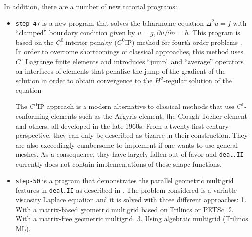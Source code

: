 \documentclass{ansarticle-preprint}
\newcommand{\specialword}[1]{\texttt{#1}}
\newcommand{\dealii}{{\specialword{deal.II}}\xspace}
\begin{document}
In addition, there are a number of new tutorial programs:
\begin{itemize}
  \item \texttt{step-47} is a new program that solves the biharmonic
        equation $\Delta^2 u = f$ with
        ``clamped'' boundary condition given by $u=g, \partial u/\partial
          n=h$. This program is based on the $C^0$ interior
        penalty ($C^0$IP) method for fourth order problems
        \cite{Brenner2005}. In order to overcome
        shortcomings of classical approaches, this method uses $C^0$ Lagrange finite
        elements and introduces ``jump'' and ``average'' operators on
        interfaces of elements that penalize the jump of the gradient of the
        solution in order to obtain convergence to the $H^2$-regular
        solution of the equation.

        The $C^0$IP approach is a modern alternative to classical methods that
        use $C^1$-conforming elements such as the Argyris
        element, the Clough-Tocher element and others, all developed in the
        late 1960s. From a twenty-first century perspective, they can only be
        described as bizarre in their construction. They are also exceedingly
        cumbersome to implement if one wants to use general meshes. As a
        consequence, they have largely fallen out of favor and \dealii{} currently
        does not contain implementations of these shape functions.

  \item \texttt{step-50} is a program that demonstrates the parallel geometric multigrid features
  in \dealii{} as described in \cite{ClevengerHeisterKanschatKronbichler2019}.
  The problem considered is a variable viscosity Laplace equation and it is solved
  with three different approaches:
  1. With a matrix-based geometric multigrid based on Trilinos or PETSc. 2. With a matrix-free
  geometric multigrid. 3. Using algebraic multigrid (Trilinos ML).



\end{itemize}
\end{document}
